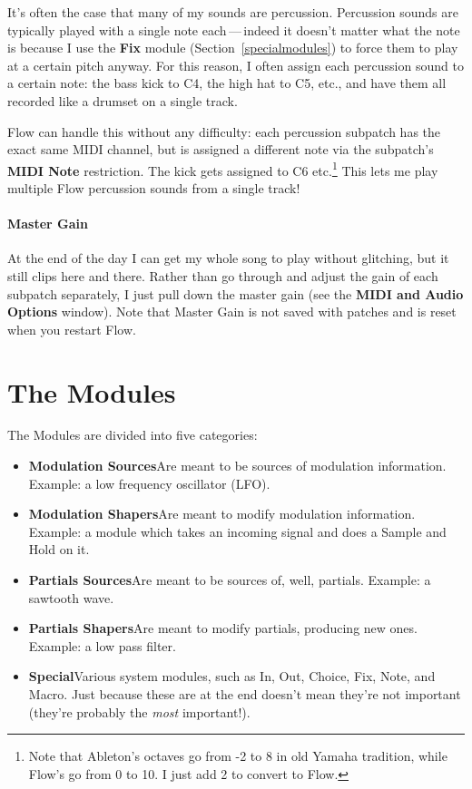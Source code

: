 \documentclass{article}
\newcommand\bump{\vspace{20in}}
\begin{document}
It's often the case that many of my sounds are percussion.  Percussion sounds are typically played with a single note each\,---\,indeed it doesn't matter what the note is because I use the {\bf Fix} module (Section~\ref{specialmodules}) to force them to play at a certain pitch anyway.  For this reason, I often assign each percussion sound to a certain note: the bass kick to C4, the high hat to C5, etc., and have them all recorded like a drumset on a single track.

Flow can handle this without any difficulty: each percussion subpatch has the exact same MIDI channel, but is assigned a different   note via the subpatch's {\bf MIDI Note} restriction.  The kick gets assigned to C6 etc.\footnote{Note that Ableton's octaves go from -2 to 8 in old Yamaha tradition, while Flow's go from 0 to 10.  I just add 2 to convert to Flow.}  This lets me play multiple Flow percussion sounds from a single track!

\paragraph{Master Gain} At the end of the day I can get my whole song to play without glitching, but it still clips here and there.  Rather than go through and adjust the gain of each subpatch separately, I just pull down the master gain (see the {\bf MIDI and Audio Options} window).     Note that Master Gain is not saved with patches and is reset when you restart Flow.

\bump

\section{The Modules}

The Modules are divided into five categories:

\begin{itemize}
\item {\bf Modulation Sources}\quad Are meant to be sources of modulation information.  Example: a low frequency oscillator (LFO).
\item {\bf Modulation Shapers}\quad Are meant to modify modulation information.  Example: a module which takes an incoming signal and does a Sample and Hold on it.
\item {\bf Partials Sources}\quad Are meant to be sources of, well, partials.  Example: a sawtooth wave.
\item {\bf Partials Shapers}\quad Are meant to modify partials, producing new ones.  Example: a low pass filter.
\item {\bf Special}\quad Various system modules, such as In, Out, Choice, Fix, Note, and Macro.  Just because these are at the end doesn't mean they're not important (they're probably the {\it most} important!).
\end{itemize}
\end{document}
